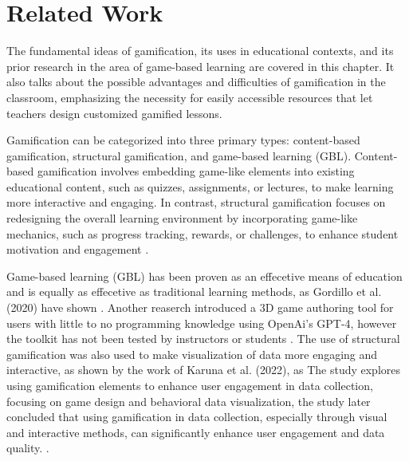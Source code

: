 \chapter{Related Work}\label{chap:relatedwork}
The fundamental ideas of gamification, its uses in educational contexts, and its prior research in the area of game-based learning are covered in this chapter. It also talks about the possible advantages and difficulties of gamification in the classroom, emphasizing the necessity for easily accessible resources that let teachers design customized gamified lessons.

Gamification can be categorized into three primary types: content-based gamification, structural gamification, and game-based learning (GBL). Content-based gamification involves embedding game-like elements into existing educational content, such as quizzes, assignments, or lectures, to make learning more interactive and engaging. In contrast, structural gamification focuses on redesigning the overall learning environment by incorporating game-like mechanics, such as progress tracking, rewards, or challenges, to enhance student motivation and engagement \cite{fernando2024}.

Game-based learning (GBL) has been proven as an effecetive means of education and is equally as effecetive as traditional learning methods, as Gordillo et al. (2020) have shown \cite{sgame2020}. Another reaserch introduced a 3D game authoring tool for users with little to no programming knowledge using OpenAi's GPT-4, however the toolkit has not been tested by instructors or students \cite{horn2023}. The use of structural gamification was also used to make visualization of data more engaging and interactive, as shown by the work of Karuna et al. (2022), as The study explores using gamification elements to enhance user engagement in data collection, focusing on game design and behavioral data visualization, the study later  concluded that using gamification in data collection, especially through visual and interactive methods, can significantly enhance user engagement and data quality. \cite{karuna2019}.


